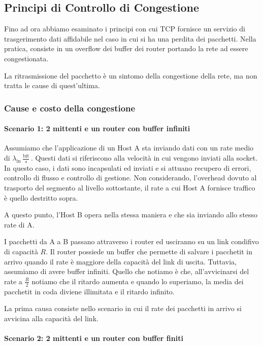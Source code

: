 \documentclass{book}
\newcommand{\tmop}[1]{\ensuremath{\operatorname{#1}}}
\begin{document}
\subsection{Principi di Controllo di Congestione}

Fino ad ora abbiamo esaminato i principi con cui TCP fornisce un servizio di
trasgerimento dati affidabile nel caso in cui si ha una perdita dei pacchetti.
Nella pratica, consiste in un overflow dei buffer dei router portando la rete
ad essere congestionata.

La ritrasmissione del pacchetto {\`e} un sintomo della congestione della rete,
ma non tratta le cause di quest'ultima.

\subsubsection{Cause e costo della congestione}

\paragraph{Scenario 1: 2 mittenti e un router con buffer infiniti}

Assumiamo che l'applicazione di un Host A sta inviando dati con un rate medio
di $\lambda_{\tmop{in}}  \frac{\tmop{bit}}{s}$. Questi dati si riferiscono
alla velocit{\`a} in cui vengono inviati alla socket. In questo caso, i dati
sono incapsulati ed inviati e si attuano recupero di errori, controllo di
flusso e controllo di gestione. Non considerando, l'overhead dovuto al
trasporto del segmento al livello sottostante, il rate a cui Host A fornisce
traffico {\`e} quello destritto sopra.

A questo punto, l'Host B opera nella stessa maniera e che sia inviando allo
stesso rate di A.

I pacchetti da A a B passano attraverso i router ed usciranno su un link
condifivo di capacit{\`a} $R$. Il router possiede un buffer che permette di
salvare i pacchetit in arrivo quando il rate {\`e} maggiore della capacit{\`a}
del link di uscita. Tuttavia, assumiamo di avere buffer infiniti. Quello che
notiamo {\`e} che, all'avvicinarsi del rate a $\frac{R}{2}$ notiamo che il
ritardo aumenta e quando lo superiamo, la media dei pacchetit in coda diviene
illimitata e il ritardo infinito.

La prima causa consiste nello scenario in cui il rate dei pacchetti in arrivo
si avvicina alla capacit{\`a} del link.

\paragraph{Scenario 2: 2 mittenti e un router con buffer finiti}
\end{document}
